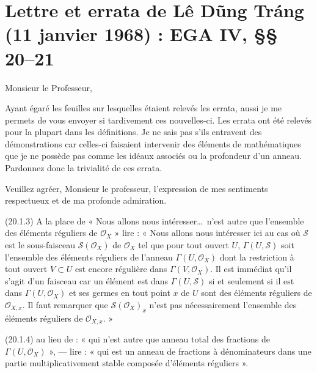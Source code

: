 \documentclass[11pt,a4paper]{article}
\begin{document}
\section{Lettre et errata de Lê Dũng Tráng (11 janvier 1968) : EGA IV, §§ 20--21}


Monsieur le Professeur,

Ayant égaré les feuilles sur lesquelles étaient relevés les errata, aussi je
me permets de vous envoyer si tardivement ces nouvelles-ci. Les errata ont été
relevés pour la plupart dans les définitions. Je ne sais pas s'ils entravent
des démonstrations car celles-ci faisaient intervenir des éléments de
mathématiques que je ne possède pas comme les idéaux associés ou la
profondeur d'un anneau. Pardonnez donc la trivialité de ces errata.

Veuillez agréer, Monsieur le professeur, l'expression de mes sentiments
respectueux et de ma profonde admiration.


(20.1.3) A la place de « Nous allons nous intéresser\ldots\ n'est autre que
l'ensemble des éléments réguliers de $\mathcal{O}_X$ » lire : « Nous allons
nous intéresser ici au cas où $\mathcal{S}$ est le sous-faisceau
$\mathcal{S}(\mathcal{O}_X)$ de $\mathcal{O}_X$ tel que pour tout ouvert $U$,
$\Gamma(U, \mathcal{S})$ soit l'ensemble des éléments réguliers de l'anneau
$\Gamma(U, \mathcal{O}_X)$ dont la restriction à tout ouvert $V \subset U$ est
encore régulière dans $\Gamma(V, \mathcal{O}_X)$. Il est immédiat qu'il s'agit
d'un faisceau car un élément est dans $\Gamma(U, \mathcal{S})$ si et seulement
si il est dans $\Gamma(U, \mathcal{O}_X)$ et  ses germes en tout
point $x$ de $U$ sont des éléments réguliers de $\mathcal{O}_{X,x}$. Il faut
remarquer que $\mathcal{S}(\mathcal{O}_X)_x$ n'est pas 
nécessairement l'ensemble des éléments réguliers de $\mathcal{O}_{X,x}$. »

(20.1.4) au lieu de : « qui n'est autre que  anneau total
des fractions de $\Gamma(U, \mathcal{O}_X)$ », --- lire : « qui est un anneau
de fractions à dénominateurs dans une partie multiplicativement stable
composée d'éléments réguliers ».
\end{document}
